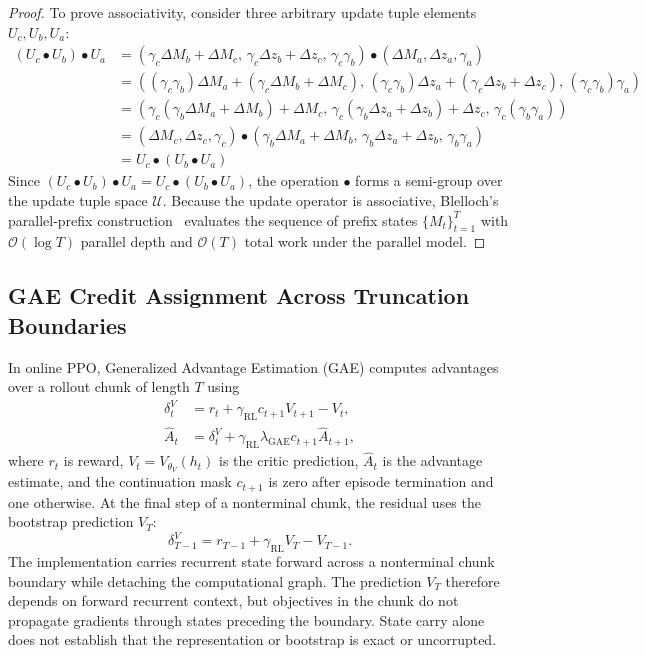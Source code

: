 \begin{proof}
To prove associativity, consider three arbitrary update tuple elements $U_c, U_b, U_a$:
\begin{align}
    \left( U_c \bullet U_b \right) \bullet U_a &= \left( \gamma_c \Delta M_b + \Delta M_c, \, \gamma_c \Delta z_b + \Delta z_c, \, \gamma_c \gamma_b \right) \bullet (\Delta M_a, \Delta z_a, \gamma_a) \\
    &= \left( (\gamma_c \gamma_b) \Delta M_a + (\gamma_c \Delta M_b + \Delta M_c), \, (\gamma_c \gamma_b) \Delta z_a + (\gamma_c \Delta z_b + \Delta z_c), \, (\gamma_c \gamma_b) \gamma_a \right) \\
    &= \left( \gamma_c (\gamma_b \Delta M_a + \Delta M_b) + \Delta M_c, \, \gamma_c (\gamma_b \Delta z_a + \Delta z_b) + \Delta z_c, \, \gamma_c (\gamma_b \gamma_a) \right) \\
    &= (\Delta M_c, \Delta z_c, \gamma_c) \bullet \left( \gamma_b \Delta M_a + \Delta M_b, \, \gamma_b \Delta z_a + \Delta z_b, \, \gamma_b \gamma_a \right) \\
    &= U_c \bullet \left( U_b \bullet U_a \right)
\end{align}
Since $\left( U_c \bullet U_b \right) \bullet U_a = U_c \bullet \left( U_b \bullet U_a \right)$, the operation $\bullet$ forms a semi-group over the update tuple space $\mathcal{U}$. Because the update operator is associative, Blelloch's parallel-prefix construction~\cite{blelloch1990prefix} evaluates the sequence of prefix states $\{M_t\}_{t=1}^T$ with $\mathcal{O}(\log T)$ parallel depth and $\mathcal{O}(T)$ total work under the parallel model.
\end{proof}

\subsection{GAE Credit Assignment Across Truncation Boundaries}
In online PPO, Generalized Advantage Estimation (GAE) computes advantages over a rollout chunk of length $T$ using
\begin{align}
\delta_t^V&=r_t+\gamma_{\mathrm{RL}}c_{t+1}V_{t+1}-V_t,\\
\widehat A_t&=\delta_t^V+\gamma_{\mathrm{RL}}\lambda_{\mathrm{GAE}}c_{t+1}\widehat A_{t+1},
\end{align}
where $r_t$ is reward, $V_t=V_{\theta_V}(h_t)$ is the critic prediction, $\widehat A_t$ is the advantage estimate, and the continuation mask $c_{t+1}$ is zero after episode termination and one otherwise. At the final step of a nonterminal chunk, the residual uses the bootstrap prediction $V_T$:
\begin{equation}
\delta_{T-1}^V=r_{T-1}+\gamma_{\mathrm{RL}}V_T-V_{T-1}.
\end{equation}
The implementation carries recurrent state forward across a nonterminal chunk boundary while detaching the computational graph. The prediction $V_T$ therefore depends on forward recurrent context, but objectives in the chunk do not propagate gradients through states preceding the boundary. State carry alone does not establish that the representation or bootstrap is exact or uncorrupted.

